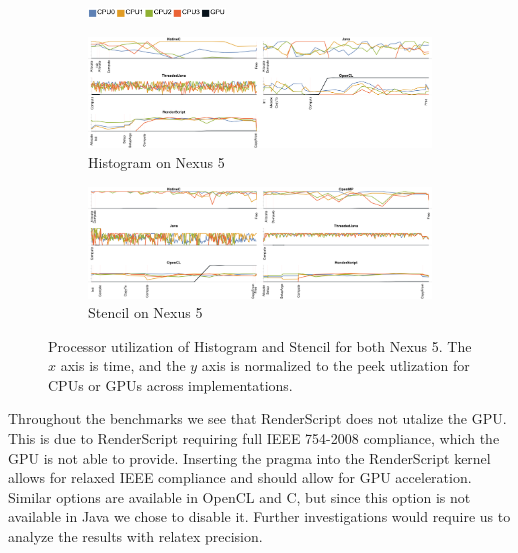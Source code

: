 \begin{figure}[t]
  \centering

  \begin{subfigure}[b]{\textwidth}
          \centering
          \includegraphics[width=0.4\textwidth]{data/load_legend.pdf}
  \end{subfigure}

  \begin{subfigure}[b]{0.9\textwidth}
      \centering
      \includegraphics[width=\textwidth]{data/load_histogram_nexus5.pdf}
      \caption{Histogram on Nexus 5}
      \label{fig:Histogram5}
  \end{subfigure}
  \begin{subfigure}[b]{0.9\textwidth}
      \centering
      \includegraphics[width=\textwidth]{data/load_stencil_nexus5.pdf}
      \caption{Stencil on Nexus 5}
      \label{fig:Stencil5}
  \end{subfigure}

  \caption{Processor utilization of Histogram and Stencil for both Nexus 5. The $x$ axis is time, and the $y$ axis is normalized to the peek utlization for CPUs or GPUs across implementations.}
  \label{fig:loadHistogramStencil}
\end{figure}
\FloatBarrier

Throughout the benchmarks we see that RenderScript
	does not utalize the GPU.
This is due to RenderScript requiring full
	IEEE 754-2008 compliance, which the GPU is not able to provide.
Inserting the  pragma into the
	RenderScript kernel allows for relaxed IEEE compliance and 
	should allow for GPU acceleration.
Similar options are available in OpenCL and C, but since
	this option is not available in Java we chose to disable it. 
Further investigations would require us to analyze the results with relatex precision.

